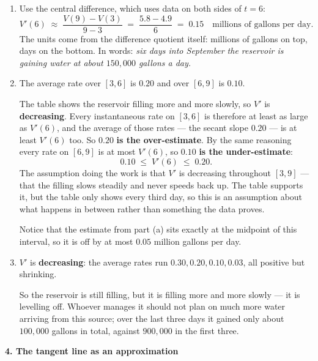 \documentclass[11pt]{article}
\newcommand{\prob}[1]{\bigskip\noindent\textbf{\large #1}\par\smallskip}
\begin{document}
\begin{enumerate}
\item Use the central difference, which uses data on both sides of $t=6$:
\[
V'(6) \;\approx\; \frac{V(9)-V(3)}{9-3} \;=\; \frac{5.8-4.9}{6} \;=\; 0.15
\quad\text{millions of gallons per day.}
\]
The units come from the difference quotient itself: millions of gallons on top, days on the
bottom. In words: \emph{six days into September the reservoir is gaining water at about
$150{,}000$ gallons a day.}

\item The average rate over $[3,6]$ is $0.20$ and over $[6,9]$ is $0.10$.

The table shows the reservoir filling more and more slowly, so $V'$ is \textbf{decreasing}.
Every instantaneous rate on $[3,6]$ is therefore at least as large as $V'(6)$, and the
average of those rates --- the secant slope $0.20$ --- is at least $V'(6)$ too. So
$\mathbf{0.20}$ \textbf{is the over-estimate}. By the same reasoning every rate on $[6,9]$
is at most $V'(6)$, so $\mathbf{0.10}$ \textbf{is the under-estimate}:
\[
0.10 \;\le\; V'(6) \;\le\; 0.20 .
\]
The assumption doing the work is that $V'$ is decreasing throughout $[3,9]$ --- that the
filling slows steadily and never speeds back up. The table supports it, but the table only
shows every third day, so this is an assumption about what happens in between rather than
something the data proves.

Notice that the estimate from part (a) sits exactly at the midpoint of this interval, so it
is off by at most $0.05$ million gallons per day.

\item $V'$ is \textbf{decreasing}: the average rates run $0.30, 0.20, 0.10, 0.03$, all
positive but shrinking.

So the reservoir is still filling, but it is filling more and more slowly --- it is
levelling off. Whoever manages it should not plan on much more water arriving from this
source; over the last three days it gained only about $100{,}000$ gallons in total, against
$900{,}000$ in the first three.
\end{enumerate}

\prob{4. The tangent line as an approximation}
\end{document}
